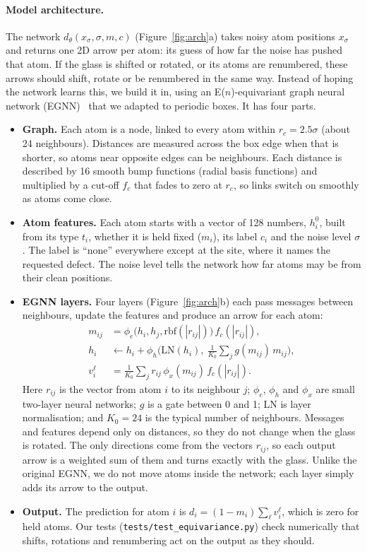 \documentclass[10pt]{article}
\begin{document}
\paragraph{Model architecture.} The network $d_\theta(x_\sigma,\sigma,m,c)$ (Figure~\ref{fig:arch}a) takes noisy atom positions $x_\sigma$ and returns one 2D arrow per atom: its guess of how far the noise has pushed that atom. If the glass is shifted or rotated, or its atoms are renumbered, these arrows should shift, rotate or be renumbered in the same way. Instead of hoping the network learns this, we build it in, using an E($n$)-equivariant graph neural network (EGNN)~\citep{satorras2021egnn} that we adapted to periodic boxes. It has four parts.
\begin{itemize}
\item \textbf{Graph.} Each atom is a node, linked to every atom within $r_c=2.5\sigma$ (about 24 neighbours). Distances are measured across the box edge when that is shorter, so atoms near opposite edges can be neighbours. Each distance is described by 16 smooth bump functions (radial basis functions) and multiplied by a cut-off $f_c$ that fades to zero at $r_c$, so links switch on smoothly as atoms come close.
\item \textbf{Atom features.} Each atom starts with a vector of 128 numbers, $h_i^0$, built from its type $t_i$, whether it is held fixed ($m_i$), its label $c_i$ and the noise level $\sigma$. The label is ``none'' everywhere except at the site, where it names the requested defect. The noise level tells the network how far atoms may be from their clean positions.
\item \textbf{EGNN layers.} Four layers (Figure~\ref{fig:arch}b) each pass messages between neighbours, update the features and produce an arrow for each atom:
\begin{align}
m_{ij} &= \phi_e\big(h_i, h_j, \mathrm{rbf}(|r_{ij}|)\big)\, f_c(|r_{ij}|), \nonumber\\
h_i &\leftarrow h_i + \phi_h\Big(\mathrm{LN}(h_i),\ \tfrac{1}{K_0}\textstyle\sum_j g(m_{ij})\, m_{ij}\Big), \label{eq:egnn}\\
v_i^\ell &= \tfrac{1}{K_0}\textstyle\sum_j r_{ij}\, \phi_x(m_{ij})\, f_c(|r_{ij}|). \nonumber
\end{align}
Here $r_{ij}$ is the vector from atom $i$ to its neighbour $j$; $\phi_e$, $\phi_h$ and $\phi_x$ are small two-layer neural networks; $g$ is a gate between 0 and 1; LN is layer normalisation; and $K_0=24$ is the typical number of neighbours. Messages and features depend only on distances, so they do not change when the glass is rotated. The only directions come from the vectors $r_{ij}$, so each output arrow is a weighted sum of them and turns exactly with the glass. Unlike the original EGNN, we do not move atoms inside the network; each layer simply adds its arrow to the output.
\item \textbf{Output.} The prediction for atom $i$ is $d_i=(1-m_i)\sum_\ell v_i^\ell$, which is zero for held atoms. Our tests (\texttt{tests/test\_equivariance.py}) check numerically that shifts, rotations and renumbering act on the output as they should.
\end{itemize}
\end{document}
